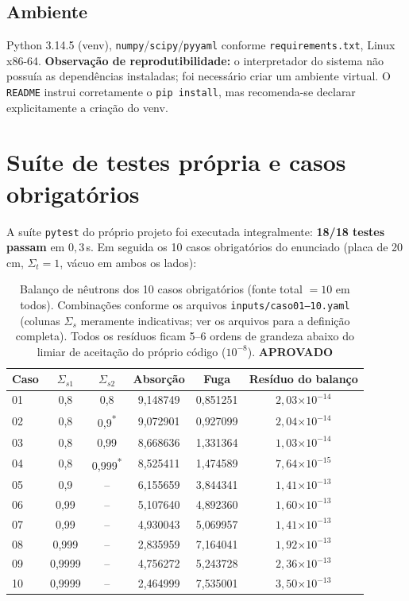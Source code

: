 \documentclass[11pt,a4paper]{article}
\newcommand{\aprovado}{\textcolor{green!45!black}{\textbf{APROVADO}}}
\newcommand{\e}[1]{\ensuremath{\times 10^{#1}}}
\begin{document}
\subsection*{Ambiente}
Python 3.14.5 (venv), \texttt{numpy}/\texttt{scipy}/\texttt{pyyaml} conforme
\texttt{requirements.txt}, Linux x86-64.
\textbf{Observação de reprodutibilidade:} o interpretador do sistema não possuía
as dependências instaladas; foi necessário criar um ambiente virtual. O
\texttt{README} instrui corretamente o \texttt{pip install}, mas recomenda-se
declarar explicitamente a criação do venv.

\section{Suíte de testes própria e casos obrigatórios}

A suíte \texttt{pytest} do próprio projeto foi executada integralmente:
\textbf{18/18 testes passam} em $0{,}3$\,s. Em seguida os 10 casos obrigatórios
do enunciado (placa de 20\,cm, $\Sigma_t = 1$, vácuo em ambos os lados):

\begin{table}[h!]\centering\small
\begin{tabular}{lccccc}
\toprule
Caso & $\Sigma_{s1}$ & $\Sigma_{s2}$ & Absorção & Fuga & Resíduo do balanço \\
\midrule
01 & 0{,}8    & 0{,}8   & 9{,}148749 & 0{,}851251 & $2{,}03\e{-14}$ \\
02 & 0{,}8    & 0{,}9\textsuperscript{*}  & 9{,}072901 & 0{,}927099 & $2{,}04\e{-14}$ \\
03 & 0{,}8    & 0{,}99  & 8{,}668636 & 1{,}331364 & $1{,}03\e{-14}$ \\
04 & 0{,}8    & 0{,}999\textsuperscript{*} & 8{,}525411 & 1{,}474589 & $7{,}64\e{-15}$ \\
05 & 0{,}9    & --      & 6{,}155659 & 3{,}844341 & $1{,}41\e{-13}$ \\
06 & 0{,}99   & --      & 5{,}107640 & 4{,}892360 & $1{,}60\e{-13}$ \\
07 & 0{,}99   & --      & 4{,}930043 & 5{,}069957 & $1{,}41\e{-13}$ \\
08 & 0{,}999  & --      & 2{,}835959 & 7{,}164041 & $1{,}92\e{-13}$ \\
09 & 0{,}9999 & --      & 4{,}756272 & 5{,}243728 & $2{,}36\e{-13}$ \\
10 & 0{,}9999 & --      & 2{,}464999 & 7{,}535001 & $3{,}50\e{-13}$ \\
\bottomrule
\end{tabular}
\caption{Balanço de nêutrons dos 10 casos obrigatórios (fonte total $=10$ em
todos). Combinações conforme os arquivos \texttt{inputs/caso01--10.yaml}
(colunas $\Sigma_s$ meramente indicativas; ver os arquivos para a definição
completa). Todos os resíduos ficam 5--6 ordens de grandeza abaixo do limiar de
aceitação do próprio código ($10^{-8}$). \aprovado}
\end{table}
\end{document}
